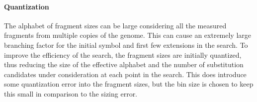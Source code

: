 
\paragraph{Quantization}
The alphabet of fragment sizes can be large considering all the measured fragments from multiple copies of the genome.  This can cause an extremely large branching factor for the initial symbol and first few extensions in the search.  To improve the efficiency of the search, the fragment sizes are initially quantized, thus reducing the size of the effective alphabet and the number of substitution candidates under consideration at each point in the search.  This does introduce some quantization error into the fragment sizes, but the bin size is chosen to keep this small in comparison to the sizing error.




